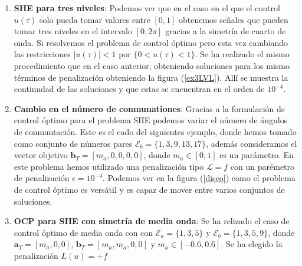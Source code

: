 \begin{enumerate}
     
    \item \textbf{SHE para tres niveles}: Podemos ver que en el caso en el que el control $u(\tau)$ solo pueda tomar valores entre $[0,1]$ obtenemos señales que pueden tomar tres niveles en el intervalo $[0,2\pi]$ gracias a la simetría de cuarto de onda. Si resolvemos el problema de control óptimo pero esta vez cambiando las restricciones $|u(\tau)|<1$ por $\{0<u(\tau)<1\}$. Se ha realizado el mismo procedimiento que en el caso anterior, obteniendo soluciones para los mismo términos de penalización obteniendo la figura (\ref{ex3LVL}). Allí se muestra la continudad de las soluciones y que estas se encuentran en el orden de $10^{-4}$.
    



    
      


    \item \textbf{Cambio en el número de conmunationes}: Gracias a la formulación de control óptimo para el problema SHE podemos variar el número de ángulos de conmuntación. 
    Este es el cado del siguientes ejemplo, donde hemos tomado como conjunto de números pares $\mathcal{E}_b = \{1,3,9,13,17\}$,   además consideramos el vector objetivo $\bm{b}_T = [m_a,0,0,0,0]$, donde  $m_a \in [0,1]$ es un parámetro. 
    En este problema hemos utilizado una penalización tipo $\mathcal{L} = f$ con un parémetro de penalización $\epsilon=10^{-4}$.
    Podemos ver en la figura (\ref{disco}) como el problema de control óptimo es versátil y es capaz de mover entre varios conjuntos de soluciones.




    
    \item \textbf{OCP para SHE con simetría de media onda}: Se ha relizado el caso de control óptimo de media onda con con $\mathcal{E}_a = \{1,3,5\}$ y  $\mathcal{E}_b = \{1,3,5,9\}$, donde $\bm{a}_T = [m_a,0,0]$, $\bm{b}_T = [m_a,m_a,0,0]$ y  $m_a \in [-0.6,0.6]$. Se ha elegido la penalización $L(u) = +f$



\end{enumerate}






